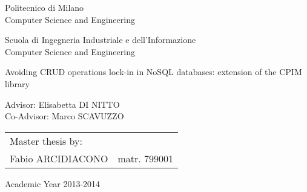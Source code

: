 \begin{titlepage}
\vspace*{-2.5cm}
\bfseries
\begin{center}
  \LARGE
  Politecnico di Milano\\
  \Large
  Computer Science and Engineering\\


\begin{large}
Scuola di Ingegneria Industriale e dell'Informazione\\
Computer Science and Engineering\\
\end{large}

\vspace{2.0cm}
\begin{Large}
Avoiding CRUD operations lock-in in NoSQL databases: extension of the CPIM library
\end{Large}  
\end{center}

\vspace*{4cm}
\large
\begin{flushleft}
\hspace{-2cm}  Advisor: Elisabetta DI NITTO\\
\hspace{-2cm}  Co-Advisor: Marco SCAVUZZO\\
\end{flushleft}
\vspace*{1.5cm}

\hspace{5.5cm}
\parbox{10cm}{
    \begin{tabular}{ll}
         Master thesis by: & \\
         Fabio ARCIDIACONO & matr. 799001\\
    \end{tabular}
}

\vspace*{1.5cm}
\begin{center}
  Academic Year 2013-2014
\end{center}

\end{titlepage}
\cleardoublepage

\thispagestyle{empty}

